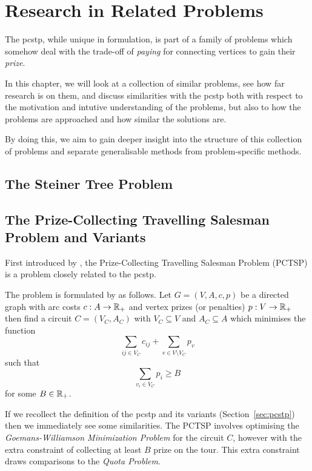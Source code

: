 \chapter{Research in Related Problems}
\label{chap:related}
The \gls{pcstp}, while unique in formulation,
is part of a family of problems which somehow deal with the trade-off of
\textit{paying} for connecting vertices to gain their \textit{prize}.

In this chapter, we will look at a collection of similar problems, see how far research is
on them, and discuss similarities with the \gls{pcstp} both with respect to the motivation and
intutive understanding of the problems, but also to how the problems are approached and
how similar the solutions are.

By doing this, we aim to gain deeper insight into the structure of this collection of problems
 and separate generalisable methods from problem-specific methods.



\section{The Steiner Tree Problem}
\section{The Prize-Collecting Travelling Salesman Problem and Variants}\label{sec:rel:tsp}
First introduced by \citet*{balas1989prize}, the Prize-Collecting Travelling Salesman Problem
(PCTSP) is a problem closely related to the \gls{pcstp}.

The problem is formulated by \citeauthor{balas1989prize} as follows. Let
$G = (V, A, c, p)$ be a directed
graph with arc costs $c: A \to \mathbb{R}_+$ and vertex prizes (or penalties) $p: V \to \mathbb{R}_+$
then find a circuit $C = (V_C, A_C)$ with $V_C \subseteq V$ and $A_C \subseteq A$ which
minimises the function
$$\sum_{ij \in V_C} c_{ij} + \sum_{v \in V \setminus V_C} p_v$$
such that
$$\sum_{v_i \in V_C} p_i \geq B$$
for some $B \in \mathbb{R}_+$.

If we recollect the definition of the \gls{pcstp} and its variants (Section~\ref{sec:pcstp}) then
we immediately see some similarities. The PCTSP involves optimising the
\textit{Goemans-Williamson Minimization Problem} for the circuit $C$, however with the extra
constraint of collecting at least $B$ prize on the tour. This extra constraint draws comparisons
to the \textit{Quota Problem}.

